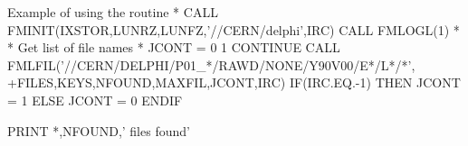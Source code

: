 \begin{XMPt}{Example of using the routine \protect{}}
*                                                                       
      CALL FMINIT(IXSTOR,LUNRZ,LUNFZ,'//CERN/delphi',IRC)               
      CALL FMLOGL(1)                                                    
*                                                                       
*     Get list of file names                                            
*                                                                       
      JCONT = 0                                                         
1     CONTINUE                                                          
      CALL FMLFIL('//CERN/DELPHI/P01_*/RAWD/NONE/Y90V00/E*/L*/*',       
     +FILES,KEYS,NFOUND,MAXFIL,JCONT,IRC)                               
      IF(IRC.EQ.-1) THEN                                                
        JCONT = 1                                                       
      ELSE                                                              
        JCONT = 0                                                       
      ENDIF                                                             
                                                                        
      PRINT *,NFOUND,' files found'                                     
                                                                        

\end{XMPt}
